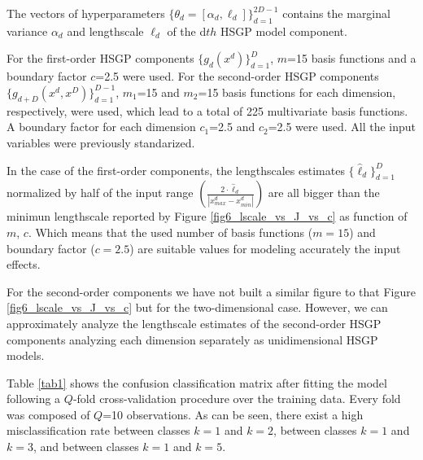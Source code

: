 \documentclass[]{interact}
\theoremstyle{plain}%
\theoremstyle{definition}
\theoremstyle{remark}
\begin{document}
The vectors of hyperparameters $\{\theta_d=[\alpha_d,\ell_d]\}_{d=1}^{2D-1}$ contains the marginal variance $\alpha_d$ and lengthscale $\ell_d$ of the d$th$ HSGP model component.
 

For the first-order HSGP components $\{g_d(x^d)\}_{d=1}^D$, $m$=15 basis functions and a boundary factor $c$=2.5 were used. For the second-order HSGP components $\{g_{d+D}(x^d,x^D)\}_{d=1}^{D-1}$, $m_1$=15 and $m_2$=15 basis functions for each dimension, respectively, were used, which lead to a total of 225 multivariate basis functions. A boundary factor for each dimension $c_1$=2.5 and $c_2$=2.5 were used. All the input variables were previously standarized.

In the case of the first-order components, the lengthscales estimates $\{\hat{\ell}_d\}_{d=1}^D$ normalized by half of the input range $\left(\frac{2\cdot \hat{\ell}_d}{|x^d_{max}-x^d_{min}|}\right)$ are all bigger than the minimun lengthscale reported by Figure \ref{fig6_lscale_vs_J_vs_c} as function of $m$, $c$. Which means that the used number of basis functions ($m=15$) and boundary factor ($c=2.5$) are suitable values for modeling accurately the input effects.

For the second-order components we have not built a similar figure to that Figure \ref{fig6_lscale_vs_J_vs_c} but for the two-dimensional case. 
However, we can approximately analyze the lengthscale estimates of the second-order HSGP components analyzing each dimension separately as unidimensional HSGP models.

Table \ref{tab1} shows the confusion classification matrix after fitting the model following a $Q$-fold cross-validation procedure over the training data. Every fold was composed of $Q$=10 observations. As can be seen, there exist a high misclassification rate between classes $k=1$ and $k=2$, between classes $k=1$ and $k=3$, and between classes $k=1$ and $k=5$.
\end{document}
